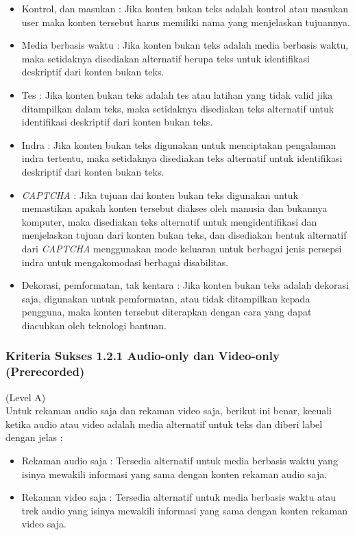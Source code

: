 \documentclass[a4paper,twoside]{article}
\begin{document}
\begin{enumerate}
		\begin{itemize}
			\item Kontrol, dan masukan : Jika konten bukan teks adalah kontrol atau masukan user maka konten tersebut harus memiliki nama yang menjelaskan tujuannya.
			\item Media berbasis waktu : Jika konten bukan teks adalah media berbasis waktu, maka setidaknya disediakan alternatif berupa teks untuk identifikasi deskriptif dari konten bukan teks.
			\item Tes : Jika konten bukan teks adalah tes atau latihan yang tidak valid jika ditampilkan dalam teks, maka setidaknya disediakan teks alternatif untuk identifikasi deskriptif dari konten bukan teks.
			\item Indra : Jika konten bukan teks digunakan untuk menciptakan pengalaman indra tertentu, maka setidaknya disediakan teks alternatif untuk identifikasi deskriptif dari konten bukan teks.
			\item \textit{CAPTCHA} : Jika tujuan dai konten bukan teks digunakan untuk memastikan apakah konten tersebut diakses oleh manusia dan bukannya komputer, maka disediakan teks alternatif untuk mengidentifikasi dan menjelaskan tujuan dari konten bukan teks, dan disediakan bentuk alternatif dari \textit{CAPTCHA} menggunakan mode keluaran untuk berbagai jenis persepsi indra untuk mengakomodasi berbagai disabilitas.
			\item Dekorasi, pemformatan, tak kentara : Jika konten bukan teks adalah dekorasi saja, digunakan untuk pemformatan, atau tidak ditampilkan kepada pengguna, maka konten tersebut diterapkan dengan cara yang dapat diacuhkan oleh teknologi bantuan.
		\end{itemize} 
		
		\subsubsection*{Kriteria Sukses 1.2.1 Audio-only dan Video-only (Prerecorded)}
		\label{subsubsec:kriteria_1.2.1}
		(Level A) \\
		
		Untuk rekaman audio saja dan rekaman video saja, berikut ini benar, kecuali ketika audio atau video adalah media alternatif untuk teks dan diberi label dengan jelas : 
		\begin{itemize}
			\item Rekaman audio saja : Tersedia alternatif untuk media berbasis waktu yang isinya mewakili informasi yang sama dengan konten rekaman audio saja.
			\item Rekaman video saja : Tersedia alternatif untuk media berbasis waktu atau trek audio yang isinya mewakili informasi yang sama dengan konten rekaman video saja.
		\end{itemize}
		

\end{enumerate}
\end{document}
